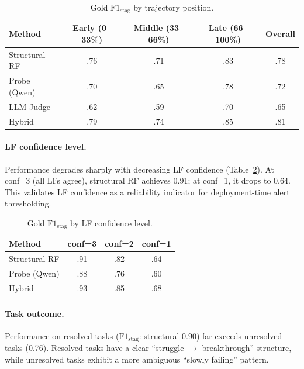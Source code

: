 \documentclass[11pt]{article}
\begin{document}
\begin{table}[t]
\centering
\caption{Gold $\text{F1}_\text{stag}$ by trajectory position.}
\label{tab:position}
\small
\begin{tabular}{lcccc}
\toprule
\textbf{Method} & \textbf{Early (0--33\%)} & \textbf{Middle (33--66\%)} & \textbf{Late (66--100\%)} & \textbf{Overall} \\
\midrule
Structural RF & .76 & .71 & .83 & .78 \\
Probe (Qwen)  & .70 & .65 & .78 & .72 \\
LLM Judge     & .62 & .59 & .70 & .65 \\
Hybrid        & .79 & .74 & .85 & .81 \\
\bottomrule
\end{tabular}
\end{table}

\paragraph{LF confidence level.} Performance degrades sharply with decreasing LF confidence (Table~\ref{tab:confidence_stag}).
At conf=3 (all LFs agree), structural RF achieves 0.91; at conf=1, it drops to 0.64.
This validates LF confidence as a reliability indicator for deployment-time alert thresholding.

\begin{table}[t]
\centering
\caption{Gold $\text{F1}_\text{stag}$ by LF confidence level.}
\label{tab:confidence_stag}
\small
\begin{tabular}{lccc}
\toprule
\textbf{Method} & \textbf{conf=3} & \textbf{conf=2} & \textbf{conf=1} \\
\midrule
Structural RF & .91 & .82 & .64 \\
Probe (Qwen)  & .88 & .76 & .60 \\
Hybrid        & .93 & .85 & .68 \\
\bottomrule
\end{tabular}
\end{table}

\paragraph{Task outcome.} Performance on resolved tasks ($\text{F1}_\text{stag}$: structural 0.90) far exceeds unresolved tasks (0.76).
Resolved tasks have a clear ``struggle $\to$ breakthrough'' structure, while unresolved tasks exhibit a more ambiguous ``slowly failing'' pattern.
\end{document}

